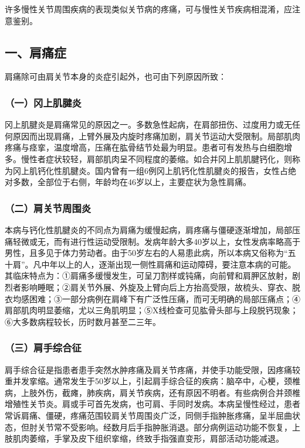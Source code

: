 许多慢性关节周围疾病的表现类似关节病的疼痛，可与慢性关节疾病相混淆，应注意鉴别。

\subsection{一、肩痛症}

肩痛除可由肩关节本身的炎症引起外，也可由下列原因所致：

\subsubsection{（一）冈上肌腱炎}

冈上肌腱炎是肩痛常见的原因之一。多数急性起病，在肩部扭伤、过度用力或无任何原因而出现肩痛，上臂外展及内旋时疼痛加剧，肩关节运动大受限制。局部肌肉疼痛与痉挛，温度增高，压痛在肱骨结节处最为明显。患者可有发热与白细胞增多。慢性者症状较轻，肩部肌肉呈不同程度的萎缩。如合并冈上肌肌腱钙化，则称为冈上肌钙化性肌腱炎。国内曾有一组6例冈上肌钙化性肌腱炎的报告，女性占绝对多数，全部位于右侧，年龄均在46岁以上，主要症状为急性肩痛。

\subsubsection{（二）肩关节周围炎}

本病与钙化性肌腱炎的不同点为肩痛为缓慢起病，肩疼痛与僵硬逐渐增加，局部压痛轻微或无，而有进行性运动受限制。发病年龄大多40岁以上，女性发病率略高于男性，且多见于体力劳动者。由于50岁左右的人易患此病，所以本病又俗称为“五十肩”。凡中年以上的人，逐渐出现一侧性肩痛和运动障碍，要注意本病的可能。其临床特点为：①肩痛多缓慢发生，可呈刀割样或钝痛，向前臂和肩胛区放射，剧烈者影响睡眠；②肩关节外展、外旋及上臂向后上方抬高受限，故梳头、穿衣、脱衣均感困难；③一部分病例在肩峰下有广泛性压痛，而可无明确的局部压痛点；④肩部肌肉明显萎缩，尤以三角肌明显；⑤X线检查可见肱骨头部与上段脱钙现象；⑥大多数病程较长，历时数月甚至二三年。

\subsubsection{（三）肩手综合征}

肩手综合征是指患者患手突然水肿疼痛及肩关节疼痛，并使手功能受限，因疼痛较重并发挛缩。通常发生于50岁以上，引起肩手综合征的疾病：脑卒中，心梗，颈椎病，上肢外伤，截瘫，肺疾病，肩关节疾病，还有原因不明者。有些病例合并颈椎增殖性关节炎。肩或手可首先发病，也可肩、手同时发病。本病呈慢性经过，患者常诉肩痛、僵硬，疼痛范围较肩关节周围炎广泛，同侧手指肿胀疼痛，呈半屈曲状态，但肘关节常不受影响。经数月后手指肿胀消退。部分病例运动功能不恢复，上肢肌肉萎缩，手掌及皮下组织挛缩，终致手指强直变形，肩部活动功能减退。

